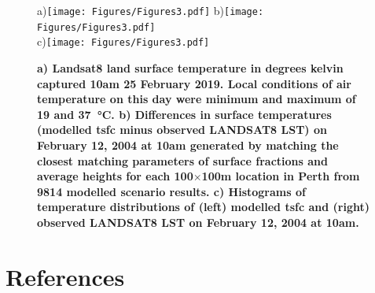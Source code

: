 \documentclass[final,3p,times,authoryear]{elsarticle}
\begin{document}
\begin{figure} 
\centering
a)\texttt{[image: Figures/Figures3.pdf]}
b)\texttt{[image: Figures/Figures3.pdf]}\\
c)\texttt{[image: Figures/Figures3.pdf]}
\caption{\bf a) Landsat8 land surface temperature in degrees kelvin captured 10am 25 February 2019. Local conditions of air temperature on this day were minimum and maximum of 19 and 37\SI{}{\degreeCelsius}. b) Differences in surface temperatures (modelled \gls{tsfc} minus observed LANDSAT8 LST) on February 12, 2004 at 10am generated by matching the closest matching parameters of surface fractions and average heights for each 100$\times$100m location in Perth from 9814 modelled scenario results. c) Histograms of temperature distributions of (left) modelled \gls{tsfc} and (right) observed LANDSAT8 LST on February 12, 2004 at 10am. }
 \label{fig:Perth-Landsat-LST-25-02-2019}
 \label{fig:Perth-Landsat-TSFC-LST-25-02-2019}
 \label{fig:Perth_TSFC14_85}
\end{figure}

























\printglossaries

\section*{References}\label{sec:ref}

   
   
\end{document}
